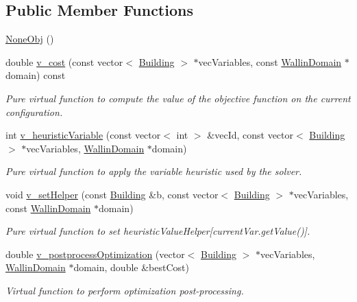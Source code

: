 \subsection*{Public Member Functions}
\begin{DoxyCompactItemize}
\item 
\hyperlink{classghost_1_1NoneObj_a854ee882e283a68bb431758712440c7c}{None\-Obj} ()
\item 
double \hyperlink{classghost_1_1NoneObj_a73a9b27b282120a3b0469253efc2e639}{v\-\_\-cost} (const vector$<$ \hyperlink{classghost_1_1Building}{Building} $>$ $\ast$vec\-Variables, const \hyperlink{classghost_1_1WallinDomain}{Wallin\-Domain} $\ast$domain) const 
\begin{DoxyCompactList}\small\item\em Pure virtual function to compute the value of the objective function on the current configuration. \end{DoxyCompactList}\item 
int \hyperlink{classghost_1_1NoneObj_aa09ad00592be7ce8380d423cd05de28e}{v\-\_\-heuristic\-Variable} (const vector$<$ int $>$ \&vec\-Id, const vector$<$ \hyperlink{classghost_1_1Building}{Building} $>$ $\ast$vec\-Variables, \hyperlink{classghost_1_1WallinDomain}{Wallin\-Domain} $\ast$domain)
\begin{DoxyCompactList}\small\item\em Pure virtual function to apply the variable heuristic used by the solver. \end{DoxyCompactList}\item 
void \hyperlink{classghost_1_1NoneObj_a12cfdb56540821d557b932b22e7a2091}{v\-\_\-set\-Helper} (const \hyperlink{classghost_1_1Building}{Building} \&b, const vector$<$ \hyperlink{classghost_1_1Building}{Building} $>$ $\ast$vec\-Variables, const \hyperlink{classghost_1_1WallinDomain}{Wallin\-Domain} $\ast$domain)
\begin{DoxyCompactList}\small\item\em Pure virtual function to set heuristic\-Value\-Helper\mbox{[}current\-Var.\-get\-Value()\mbox{]}. \end{DoxyCompactList}\item 
double \hyperlink{classghost_1_1NoneObj_aafc43cad67f5ccd5e3c913a576896669}{v\-\_\-postprocess\-Optimization} (vector$<$ \hyperlink{classghost_1_1Building}{Building} $>$ $\ast$vec\-Variables, \hyperlink{classghost_1_1WallinDomain}{Wallin\-Domain} $\ast$domain, double \&best\-Cost)
\begin{DoxyCompactList}\small\item\em Virtual function to perform optimization post-\/processing. \end{DoxyCompactList}\end{DoxyCompactItemize}

